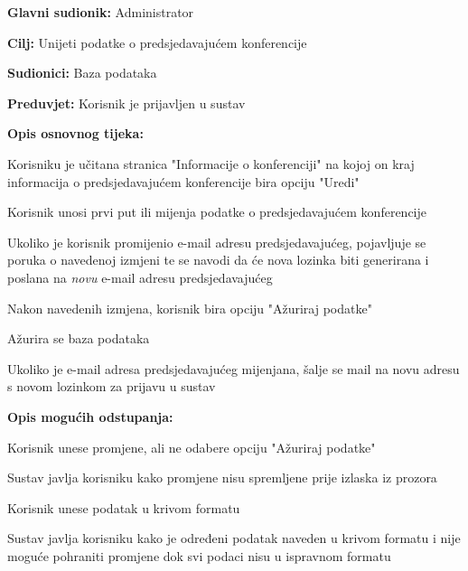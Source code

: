 					\noindent {}
					\begin{packed_item}
						\item \textbf{Glavni sudionik:} Administrator
						\item \textbf{Cilj:} Unijeti podatke o predsjedavajućem konferencije
						\item \textbf{Sudionici:} Baza podataka
						\item \textbf{Preduvjet:} Korisnik je prijavljen u sustav
						
						\item \textbf{Opis osnovnog tijeka:} 
						\item[] \begin{packed_enum}
							\item Korisniku je učitana stranica "Informacije o konferenciji" na kojoj on kraj informacija o predsjedavajućem konferencije bira opciju "Uredi"
							\item Korisnik unosi prvi put ili mijenja podatke o predsjedavajućem konferencije
							\item Ukoliko je korisnik promijenio e-mail adresu predsjedavajućeg, pojavljuje se poruka o navedenoj izmjeni te se navodi da će nova lozinka biti generirana i poslana na \textit{novu} e-mail adresu predsjedavajućeg
							\item Nakon navedenih izmjena, korisnik bira opciju "Ažuriraj podatke"
							\item Ažurira se baza podataka
							\item Ukoliko je e-mail adresa predsjedavajućeg mijenjana, šalje se mail na novu adresu s novom lozinkom za prijavu u sustav
						\end{packed_enum}
					
						\item \textbf{Opis mogućih odstupanja:}
						\item[] \begin{packed_enum}

							\item[3.a] Korisnik unese promjene, ali ne odabere opciju "Ažuriraj podatke"
							\item[] \begin{packed_enum}
								\item[1.] Sustav javlja korisniku kako promjene nisu spremljene prije izlaska iz prozora
							\end{packed_enum}
							\item[3.b] Korisnik unese podatak u krivom formatu
							\item[] \begin{packed_enum}
								\item[1.] Sustav javlja korisniku kako je određeni podatak naveden u krivom formatu i nije moguće pohraniti promjene dok svi podaci nisu u ispravnom formatu
							\end{packed_enum}
							
						\end{packed_enum}
					\end{packed_item}
				\pagebreak

